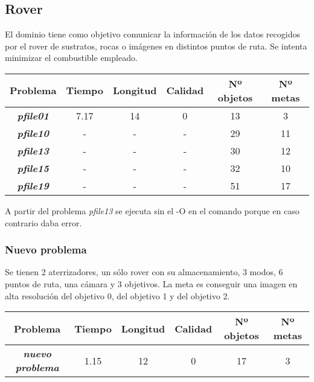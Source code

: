\documentclass{uc3mpracticas}
\begin{document}
\subsection{Rover}

El dominio tiene como objetivo comunicar la información de los datos recogidos por el rover de sustratos, rocas o imágenes en distintos puntos de ruta. Se intenta minimizar el combustible empleado.

\begin{center}
  \begin{tabular}{|c|c|c|c|c|c|}
    \hline
                  \textbf{Problema}       & \textbf{Tiempo} & \textbf{Longitud} & \textbf{Calidad} & \textbf{Nº objetos} & \textbf{Nº metas}\\ \hline \hline
        \textit{\textbf{pfile01}}         &  7.17           & 14                & 0                & 13                  & 3            \\ \hline
        \textit{\textbf{pfile10}}         &  -              & -                 & -                & 29                  & 11           \\ \hline
        \textit{\textbf{pfile13}}         &  -              & -                 & -                & 30                  & 12           \\ \hline
        \textit{\textbf{pfile15}}         &  -              & -                 & -                & 32                  & 10           \\ \hline
        \textit{\textbf{pfile19}}         &  -              & -                 & -                & 51                  & 17           \\ \hline
  \end{tabular}
\end{center}

A partir del problema \textit{pfile13} se ejecuta sin el -O en el comando porque en caso contrario daba error.


\subsubsection*{Nuevo problema}

Se tienen 2 aterrizadores, un sólo rover con su almacenamiento, 3 modos, 6 puntos de ruta, una cámara y 3 objetivos. La meta es conseguir una imagen en alta resolución del objetivo 0, del objetivo 1 y del objetivo 2.


\begin{center}
  \begin{tabular}{|c|c|c|c|c|c|}
    \hline
                  \textbf{Problema}       & \textbf{Tiempo} & \textbf{Longitud} & \textbf{Calidad} & \textbf{Nº objetos} & \textbf{Nº metas}\\ \hline \hline
        \textit{\textbf{nuevo problema}}  &  1.15           & 12                & 0                & 17                  & 3                \\ \hline
  \end{tabular}
\end{center}
\end{document}
